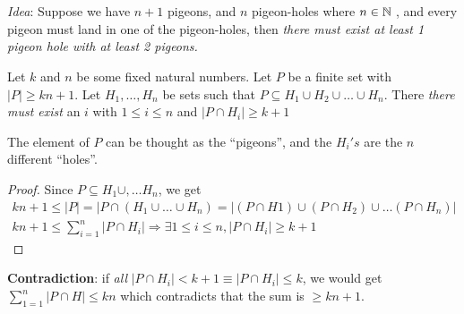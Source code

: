 \documentclass[11pt]{article}
\begin{document}

\section*{}
\textit{Idea}: Suppose we have $n+1$ pigeons, and $n$ pigeon-holes where $n \in \mathbb{N}\hspace{1.0mm}$, and every pigeon must land in one of the pigeon-holes, then \textit{there must exist at least 1 pigeon hole with at least 2 pigeons.}

    \begin{theorem}
        Let $k$ and $n$ be some fixed natural numbers. Let $P$ be a finite set with $|P| \geq kn + 1$. Let $H_{1}, \ldots, H_{n}$ be sets such that $P \subseteq H_{1} \cup H_{2} \cup \ldots \cup H_{n}.$ There \textit{there must exist} an $i$ with $1 \leq i \leq n$ and $|P \cap H_{i}| \geq k+ 1$
    \end{theorem}
    The element of $P$ can be thought as the ``pigeons'', and the $H_{i}'s$ are the $n$ different ``holes''.

    \begin{proof}
        Since $P \subseteq H_{1} \cup, \ldots H_{n}$, we get \\
        \begin{gather}
            kn+1 \leq |P| = |P \cap (H_{1} \cup \ldots \cup H_{n}) = |(P \cap H{1}) \cup (P \cap H_{2}) \cup \ldots (P \cap H_{n})| \\
            kn+1 \leq \sum_{i=1}^{n} |P \cap H_{i}| \Rightarrow \exists 1 \leq i \leq n, |P \cap H_{i}| \geq k + 1
        \end{gather}
    \end{proof}
    \textbf{Contradiction}:  if \textit{all} $|P \cap H_{i}| < k+1 \equiv |P \cap H_{i}| \leq k$, we would get $\sum_{1=1}^{n} |P \cap H| \leq kn$ which contradicts that the sum is $\geq kn + 1.$
\end{document}
